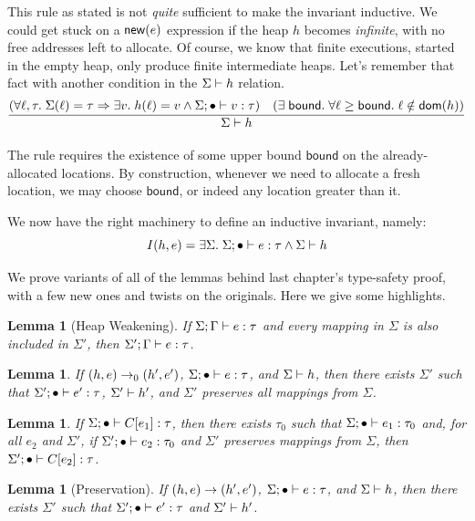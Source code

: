 \documentclass{amsbook}
\newtheorem{lemma}[theorem]{Lemma}
\theoremstyle{definition}
\theoremstyle{remark}
\numberwithin{section}{chapter}
\numberwithin{equation}{chapter}
\begin{document}
This rule as stated is not \emph{quite} sufficient to make the invariant inductive.
We could get stuck on a $\mathsf{new}(e)$ expression if the heap $h$ becomes \emph{infinite}, with no free addresses left to allocate.
Of course, we know that finite executions, started in the empty heap, only produce finite intermediate heaps.
Let's remember that fact with another condition in the $\Sigma \vdash h$ relation.
$$\infer{\heapty{\Sigma}{h}}{
  (\forall \ell, \tau. \; \msel{\Sigma}{\ell} = \tau \Rightarrow \exists v. \; \msel{h}{\ell} = v \land \rhasty{\Sigma}{\mempty}{v}{\tau})
  & (\exists \; \mathsf{bound}. \; \forall \ell \geq \mathsf{bound}. \; \ell \notin \dom{h})
}$$

The rule requires the existence of some upper bound $\mathsf{bound}$ on the already-allocated locations.
By construction, whenever we need to allocate a fresh location, we may choose $\mathsf{bound}$, or indeed any location greater than it.

We now have the right machinery to define an inductive invariant, namely:
\invariants
$$I(h, e) = \exists \Sigma. \; \Sigma; \bullet \vdash e : \tau \land \Sigma \vdash h$$

We prove variants of all of the lemmas behind last chapter's type-safety proof, with a few new ones and twists on the originals.
Here we give some highlights.

\begin{lemma}[Heap Weakening]
  If $\Sigma; \Gamma \vdash e : \tau$ and every mapping in $\Sigma$ is also included in $\Sigma'$, then $\Sigma'; \Gamma \vdash e : \tau$.
\end{lemma}

\begin{lemma}
  If $(h, e) \to_0 (h', e')$, $\Sigma; \bullet \vdash e : \tau$, and $\Sigma \vdash h$, then there exists $\Sigma'$ such that $\Sigma'; \bullet \vdash e' : \tau$, $\Sigma' \vdash h'$, and $\Sigma'$ preserves all mappings from $\Sigma$.
\end{lemma}

\begin{lemma}
  If $\Sigma; \bullet \vdash C[e_1] : \tau$, then there exists $\tau_0$ such that $\Sigma; \bullet \vdash e_1 : \tau_0$ and, for all $e_2$ and $\Sigma'$, if $\Sigma'; \bullet \vdash e_2 : \tau_0$ and $\Sigma'$ preserves mappings from $\Sigma$, then $\Sigma'; \bullet \vdash C[e_2] : \tau$.
\end{lemma}

\begin{lemma}[Preservation]
  If $(h, e) \to (h', e')$, $\Sigma; \bullet \vdash e : \tau$, and $\Sigma \vdash h$, then there exists $\Sigma'$ such that $\Sigma'; \bullet \vdash e' : \tau$ and $\Sigma' \vdash h'$.
\end{lemma}
\end{document}
